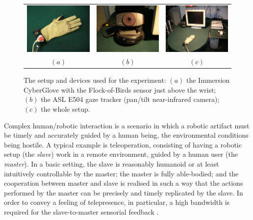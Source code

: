 \documentclass{article}
\begin{document}
\begin{figure}[ht]
  \centering
    \begin{tabular}{ccc}
      \includegraphics[width=0.31\linewidth]{glove.eps} &
      \includegraphics[width=0.31\linewidth]{e504.eps} &
      \includegraphics[width=0.31\linewidth]{setup.eps} \\
      $(a)$ & $(b)$ & $(c)$
    \end{tabular}
    \caption{The setup and devices used for the experiment: $(a)$ the
    Immersion CyberGlove with the Flock-of-Birds sensor just above the
    wrist; $(b)$ the ASL E504 gaze tracker (pan/tilt near-infrared
    camera); $(c)$ the whole setup.}
    \label{fig:devices}
\end{figure}

Complex human/robotic interaction is a scenario in which a robotic
artifact must be timely and accurately guided by a human being, the
environmental conditions being hostile. A typical example is
teleoperation, consisting of having a robotic setup (the \emph{slave})
work in a remote environment, guided by a human user (the
\emph{master}). In a basic setting, the slave is reasonably humanoid
or at least intuitively controllable by the master; the master is
fully able-bodied; and the cooperation between master and slave is
realised in such a way that the actions performed by the master can be
precisely and timely replicated by the slave. In order to convey a
feeling of telepresence, in particular, a high bandwidth is required
for the slave-to-master sensorial feedback \cite{telesensation}.
\end{document}
